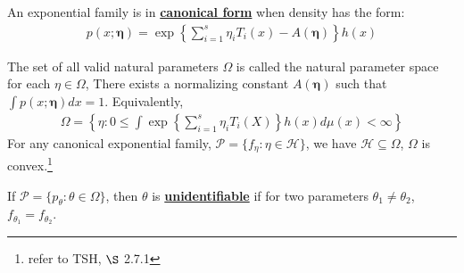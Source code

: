 \begin{definition}
    An exponential family is in \textbf{\uline{canonical form}} when density has the form:
    \begin{gather}
        p(x;\boldsymbol{\eta})=\exp\left\{ \sum_{i=1}^s\eta_iT_i(x)-A(\boldsymbol{\eta}) \right\}h(x)
    \end{gather}
\end{definition}

\begin{definition}
    The set of all valid natural parameters $\Omega$ is called the natural parameter space for each $\eta\in\Omega$,
    There exists a normalizing constant $A(\boldsymbol{\eta})$ such that $\int{p(x;\boldsymbol{\eta})}dx=1$.
    Equivalently,
    \begin{gather}
        \Omega=\left\{ \eta:0\leq\int\exp\left\{\sum_{i=1}^s\eta_iT_i(X)\right\}h(x)d\mu(x) < \infty \right\}
    \end{gather}
    For any canonical exponential family, $\mathcal{P}=\{f_\eta:\eta\in\mathcal{H}\}$,
    we have $\mathcal{H}\subseteq\Omega$, $\Omega$ is convex.\footnote{refer to TSH, $\S$ 2.7.1}
\end{definition}

\begin{definition}[Unidentifiable]
    If $\mathcal{P}=\{p_\theta:\theta\in\Omega\}$, then $\theta$ is \textbf{\uline{unidentifiable}}
    if for two parameters $\theta_1\neq\theta_2$, $f_{\theta_1}=f_{\theta_2}$.
\end{definition}

